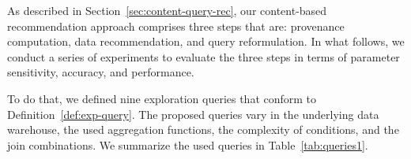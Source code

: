 \label{eval-sec:content}

As described in Section~\ref{sec:content-query-rec}, our content-based recommendation approach comprises three steps that are: provenance computation, data recommendation, and query reformulation.
In what follows, we conduct a series of experiments to evaluate the three steps in terms of parameter sensitivity, accuracy, and performance. %



To do that, we defined nine exploration queries that conform to Definition~\ref{def:exp-query}.
The proposed queries vary in the underlying data warehouse, the used aggregation functions, the complexity of conditions, and the join combinations.
We summarize the used queries in Table~\ref{tab:queries1}. 



